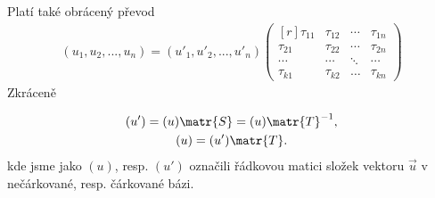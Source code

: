       Platí také obrácený převod
      \begin{gather*}
        (u_1, u_2, ..., u_n) = (u'_1, u'_2, ..., u'_n)
        \begin{pmatrix*}[r]
          \tau_{11} & \tau_{12} & \cdots & \tau_{1n}    \\
          \tau_{21} & \tau_{22} & \cdots & \tau_{2n}    \\
          \cdots    & \cdots    & \ddots & \cdots       \\
          \tau_{k1} & \tau_{k2} & \ldots & \tau_{kn}
        \end{pmatrix*}
      \end{gather*}  
      \endgroup
      Zkráceně
      \begin{mdframed}[style=highlight]
        \begin{equation}\label{mai:eq84}
          \begin{gathered}
            ({u}') = ({u})\matr{S} = ({u})\matr{T}^{-1}, \\
            ({u}) = ({u}')\matr{T}.
          \end{gathered}
        \end{equation}
        kde jsme jako \(({u})\), resp. \(({u}')\) označili řádkovou matici složek vektoru
        \(\vec{u}\) v nečárkované, resp. čárkované bázi.
      \end{mdframed}

        

